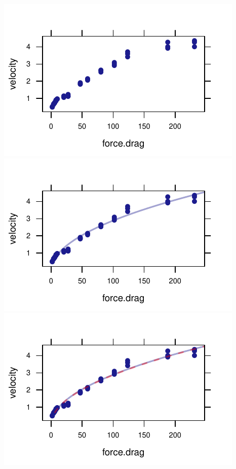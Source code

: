 \documentclass[twoside]{book}\usepackage[]{graphicx}\usepackage[]{xcolor}
\makeatletter
\def\maxwidth{ %
  \ifdim\Gin@nat@width>\linewidth
    \linewidth
  \else
    \Gin@nat@width
  \fi
}
\newenvironment{knitrout}{}{} %
\makeatother
\begin{document}
\begin{solution}
\begin{knitrout}
{\centering \includegraphics[width=\maxwidth]{figures/fig-unnamed-chunk-221-1} 
\includegraphics[width=\maxwidth]{figures/fig-unnamed-chunk-221-2} 
\includegraphics[width=\maxwidth]{figures/fig-unnamed-chunk-221-3} 
}
\end{knitrout}
\end{solution}
\end{document}
